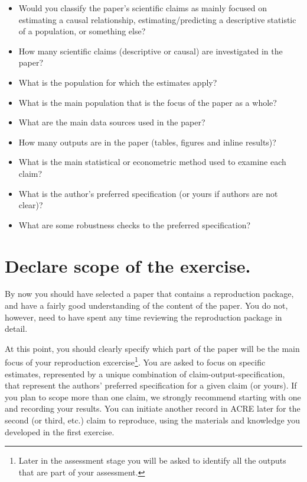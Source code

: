 \documentclass[]{book}
\providecommand{\tightlist}{%
  \setlength{\itemsep}{0pt}\setlength{\parskip}{0pt}}
\begin{document}
\begin{itemize}
\tightlist
\item
  Would you classify the paper's scientific claims as mainly focused on estimating a causal relationship, estimating/predicting a descriptive statistic of a population, or something else?
\item
  How many scientific claims (descriptive or causal) are investigated in the paper?
\item
  What is the population for which the estimates apply?
\item
  What is the main population that is the focus of the paper as a whole?
\item
  What are the main data sources used in the paper?
\item
  How many outputs are in the paper (tables, figures and inline results)?\\
\item
  What is the main statistical or econometric method used to examine each claim?
\item
  What is the author's preferred specification (or yours if authors are not clear)?
\item
  What are some robustness checks to the preferred specification?
\end{itemize}

\hypertarget{declare-estimates}{%
\section{Declare scope of the exercise.}\label{declare-estimates}}

By now you should have selected a paper that contains a reproduction package, and have a fairly good understanding of the content of the paper. You do not, however, need to have spent any time reviewing the reproduction package in detail.

At this point, you should clearly specify which part of the paper will be the main focus of your reproduction excercise\footnote{Later in the assessment stage you will be asked to identify all the outputs that are part of your assessment.}. You are asked to focus on specific estimates, represented by a unique combination of claim-output-specification, that represent the authors' preferred specification for a given claim (or yours). If you plan to scope more than one claim, we strongly recommend starting with one and recording your results. You can initiate another record in ACRE later for the second (or third, etc.) claim to reproduce, using the materials and knowledge you developed in the first exercise.
\end{document}
